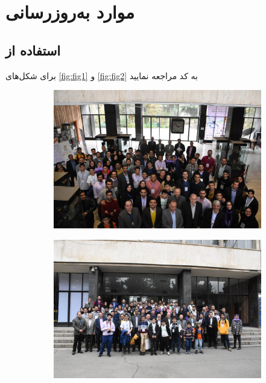 \chapter{موارد به‌روزرسانی}
\section{ استفاده از }
برای شکل‌های 
\ref{fig:fig1} و \ref{fig:fig2}
به کد مراجعه نمایید
\begin{figure}[h!]
		\centering %
		\begin{subfigure}{0.33\textwidth}
			\includegraphics[width=\linewidth]{Images/Chapter6/test1.jpg}
			\caption{}
			\label{f61}
		\end{subfigure}\hfil %
		\begin{subfigure}{0.33\textwidth}
			\includegraphics[width=\linewidth]{Images/Chapter6/test2.jpg}
			\caption{}

\end{subfigure}
\end{figure}

